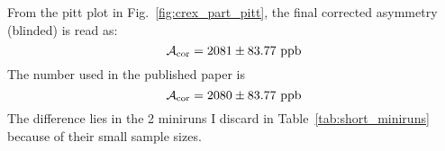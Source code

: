 From the pitt plot in Fig.~\ref{fig:crex_part_pitt}, 
the final corrected asymmetry (blinded) is read as: 
\begin{equation}
    \CA_{\text{cor}} = 2081 \pm 83.77\ \mathrm{ppb}
\end{equation}
The number used in the published paper is
\begin{equation}
    \CA_{\text{cor}} = 2080 \pm 83.77\ \mathrm{ppb}
\end{equation}
The difference lies in the 2 miniruns I discard in Table~\ref{tab:short_miniruns} because of their small
sample sizes.
